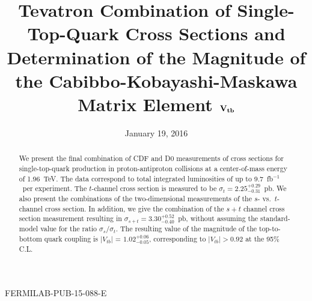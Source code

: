 \documentclass[aps,prl,twocolumn,showpacs,superscriptaddress,groupedaddress]{revtex4}  %
\newcommand{\ifb}       {fb$^{-1}$}
\begin{document}
\hspace{5.2in} \mbox{FERMILAB-PUB-15-088-E}


\title{Tevatron Combination of Single-Top-Quark Cross Sections and
  Determination of the Magnitude of the Cabibbo-Kobayashi-Maskawa
  Matrix Element $\bf V_{tb}$}


%
%

\date{January 19, 2016}


\begin{abstract}
\noindent
We present the final combination of CDF and D0 measurements of cross
sections for single-top-quark production in proton-antiproton
collisions at a center-of-mass energy of 1.96~TeV. The data correspond
to total integrated luminosities of  up to 9.7~\ifb\ per
experiment. The $t$-channel cross section is measured to be $\sigma_t
= 2.25^{+0.29}_{-0.31}$~pb. We also present the combinations of the
two-dimensional measurements of the $s$- vs.\ $t$-channel cross
section. In addition, we give the combination of the $s+t$ channel
cross section measurement resulting 
in $\sigma_{s+t} = 3.30^{+0.52}_{-0.40}$~pb, without assuming the
standard-model value for the ratio $\sigma_s/\sigma_t$. The resulting
value of the magnitude of the top-to-bottom quark coupling is
$|V_{tb}|$ = $1.02^{+0.06}_{-0.05}$, corresponding to $|V_{tb}| >
0.92$ at the 95\% C.L.
\end{abstract} 



\maketitle







\end{document}
